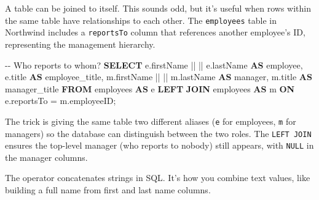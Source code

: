 \documentclass[
  letterpaper,
  DIV=11,
  numbers=noendperiod]{scrreprt}
\newenvironment{Shaded}{\begin{snugshade}}{\end{snugshade}}
\newcommand{\CommentTok}[1]{\textcolor[rgb]{0.37,0.37,0.37}{#1}}
\newcommand{\KeywordTok}[1]{\textcolor[rgb]{0.00,0.23,0.31}{\textbf{#1}}}
\newcommand{\NormalTok}[1]{\textcolor[rgb]{0.00,0.23,0.31}{#1}}
\newcommand{\OperatorTok}[1]{\textcolor[rgb]{0.37,0.37,0.37}{#1}}
\newcommand{\StringTok}[1]{\textcolor[rgb]{0.13,0.47,0.30}{#1}}
\begin{document}
A table can be joined to itself. This sounds odd, but it's useful when
rows within the same table have relationships to each other. The
\texttt{employees} table in Northwind includes a \texttt{reportsTo}
column that references another employee's ID, representing the
management hierarchy.

\begin{codelisting}

\caption{\texttt{duckdb}}

\begin{Shaded}
\begin{Highlighting}[]
\CommentTok{{-}{-} Who reports to whom?}
\KeywordTok{SELECT}
\NormalTok{    e.firstName }\OperatorTok{||} \StringTok{\textquotesingle{} \textquotesingle{}} \OperatorTok{||}\NormalTok{ e.lastName }\KeywordTok{AS}\NormalTok{ employee,}
\NormalTok{    e.title }\KeywordTok{AS}\NormalTok{ employee\_title,}
\NormalTok{    m.firstName }\OperatorTok{||} \StringTok{\textquotesingle{} \textquotesingle{}} \OperatorTok{||}\NormalTok{ m.lastName }\KeywordTok{AS}\NormalTok{ manager,}
\NormalTok{    m.title }\KeywordTok{AS}\NormalTok{ manager\_title}
\KeywordTok{FROM}\NormalTok{ employees }\KeywordTok{AS}\NormalTok{ e}
\KeywordTok{LEFT} \KeywordTok{JOIN}\NormalTok{ employees }\KeywordTok{AS}\NormalTok{ m}
    \KeywordTok{ON}\NormalTok{ e.reportsTo }\OperatorTok{=}\NormalTok{ m.employeeID;}
\end{Highlighting}
\end{Shaded}

\end{codelisting}

The trick is giving the same table two different aliases (\texttt{e} for
employees, \texttt{m} for managers) so the database can distinguish
between the two roles. The \texttt{LEFT\ JOIN} ensures the top-level
manager (who reports to nobody) still appears, with \texttt{NULL} in the
manager columns.

The \texttt{\textbar{}\textbar{}} operator concatenates strings in SQL.
It's how you combine text values, like building a full name from first
and last name columns.
\end{document}
